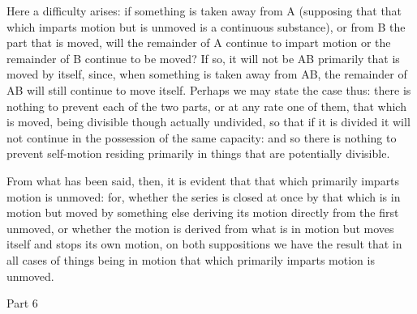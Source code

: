 Here a difficulty arises: if something is taken away from A (supposing
that that which imparts motion but is unmoved is a continuous substance),
or from B the part that is moved, will the remainder of A continue
to impart motion or the remainder of B continue to be moved? If so,
it will not be AB primarily that is moved by itself, since, when something
is taken away from AB, the remainder of AB will still continue to
move itself. Perhaps we may state the case thus: there is nothing
to prevent each of the two parts, or at any rate one of them, that
which is moved, being divisible though actually undivided, so that
if it is divided it will not continue in the possession of the same
capacity: and so there is nothing to prevent self-motion residing
primarily in things that are potentially divisible. 

From what has been said, then, it is evident that that which primarily
imparts motion is unmoved: for, whether the series is closed at once
by that which is in motion but moved by something else deriving its
motion directly from the first unmoved, or whether the motion is derived
from what is in motion but moves itself and stops its own motion,
on both suppositions we have the result that in all cases of things
being in motion that which primarily imparts motion is unmoved.

Part 6

